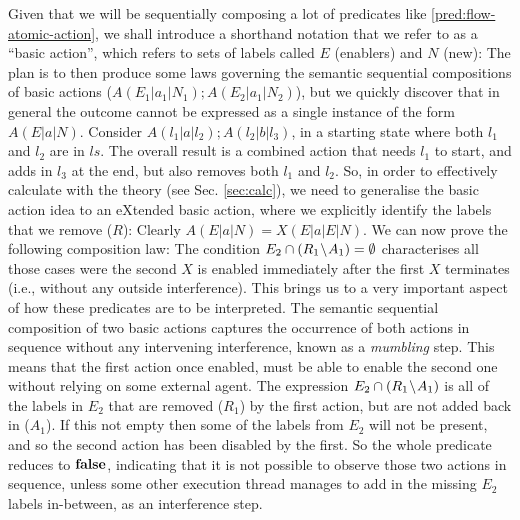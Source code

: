 Given that we will be sequentially composing a lot of predicates
like \ref{pred:flow-atomic-action},
we shall introduce a shorthand notation that we refer to as
a ``basic action'',
which refers to sets of labels called $E$ (enablers) and $N$ (new):
The plan is to then produce some laws governing
the semantic sequential compositions of basic actions
($A(E_1|a_1|N_1);A(E_2|a_1|N_2)$),
but we quickly discover that
in general the outcome cannot be expressed as a single instance
of the form $A(E|a|N)$.
Consider $A(l_1|a|l_2);A(l_2|b|l_3)$,
in a starting state where both $l_1$ and $l_2$ are in $ls$.
The overall result is a combined action that needs $l_1$
to start, and adds in $l_3$ at the end,
but also removes both $l_1$ and $l_2$.
So, in order to effectively calculate with the theory
(see Sec. \ref{sec:calc}), we need to generalise the basic action idea
to an eXtended basic action,
where we explicitly identify the labels that we remove ($R$):
Clearly $A(E|a|N) = X(E|a|E|N)$.
We can now prove the following composition law:
The condition $E_2 \cap (R_1\!\setminus\! A_1) = \emptyset$
characterises all those cases were the second $X$ is enabled
immediately after the first $X$ terminates
(i.e., without any outside interference).
This brings us to a very important aspect of how these predicates are to be
interpreted.
The semantic sequential composition of two basic actions
captures the occurrence of both actions in sequence without any intervening
interference, known as a \emph{mumbling} step.
This means that the first action once enabled,
must be able to enable the second one without relying on some external agent.
The expression $E_2 \cap (R_1\!\setminus\! A_1)$ is all of the labels in $E_2$
that are removed ($R_1$) by the first action, but are not added back in ($A_1$).
If this not empty then some of the labels from $E_2$ will not be present,
and so the second action has been disabled by the first.
So the whole predicate reduces to $\mathbf{false}$,
indicating that it is not possible to observe those two actions in sequence,
unless some other execution thread manages to add in the missing $E_2$ labels
in-between, as an interference step.
